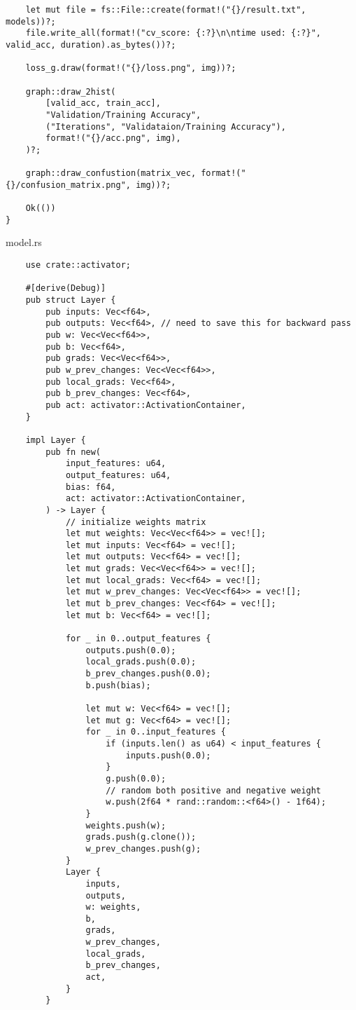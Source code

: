 \begin{verbatim}
    let mut file = fs::File::create(format!("{}/result.txt", models))?;
    file.write_all(format!("cv_score: {:?}\n\ntime used: {:?}", valid_acc, duration).as_bytes())?;

    loss_g.draw(format!("{}/loss.png", img))?;

    graph::draw_2hist(
        [valid_acc, train_acc],
        "Validation/Training Accuracy",
        ("Iterations", "Validataion/Training Accuracy"),
        format!("{}/acc.png", img),
    )?;

    graph::draw_confustion(matrix_vec, format!("{}/confusion_matrix.png", img))?;

    Ok(())
}
\end{verbatim}
\noindent model.rs
\begin{verbatim}
    use crate::activator;

    #[derive(Debug)]
    pub struct Layer {
        pub inputs: Vec<f64>,
        pub outputs: Vec<f64>, // need to save this for backward pass
        pub w: Vec<Vec<f64>>,
        pub b: Vec<f64>,
        pub grads: Vec<Vec<f64>>,
        pub w_prev_changes: Vec<Vec<f64>>,
        pub local_grads: Vec<f64>,
        pub b_prev_changes: Vec<f64>,
        pub act: activator::ActivationContainer,
    }
    
    impl Layer {
        pub fn new(
            input_features: u64,
            output_features: u64,
            bias: f64,
            act: activator::ActivationContainer,
        ) -> Layer {
            // initialize weights matrix
            let mut weights: Vec<Vec<f64>> = vec![];
            let mut inputs: Vec<f64> = vec![];
            let mut outputs: Vec<f64> = vec![];
            let mut grads: Vec<Vec<f64>> = vec![];
            let mut local_grads: Vec<f64> = vec![];
            let mut w_prev_changes: Vec<Vec<f64>> = vec![];
            let mut b_prev_changes: Vec<f64> = vec![];
            let mut b: Vec<f64> = vec![];
    
            for _ in 0..output_features {
                outputs.push(0.0);
                local_grads.push(0.0);
                b_prev_changes.push(0.0);
                b.push(bias);
    
                let mut w: Vec<f64> = vec![];
                let mut g: Vec<f64> = vec![];
                for _ in 0..input_features {
                    if (inputs.len() as u64) < input_features {
                        inputs.push(0.0);
                    }
                    g.push(0.0);
                    // random both positive and negative weight
                    w.push(2f64 * rand::random::<f64>() - 1f64);
                }
                weights.push(w);
                grads.push(g.clone());
                w_prev_changes.push(g);
            }
            Layer {
                inputs,
                outputs,
                w: weights,
                b,
                grads,
                w_prev_changes,
                local_grads,
                b_prev_changes,
                act,
            }
        }
    

\end{verbatim}
